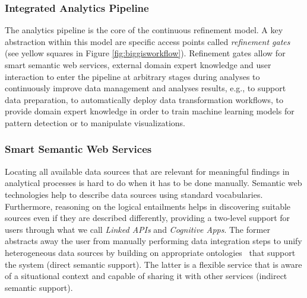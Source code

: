 \documentclass{sig-alternate-05-2015}
\begin{document}
\subsubsection{Integrated Analytics Pipeline}
The analytics pipeline is the core of the continuous refinement model. A key
abstraction within this model are specific access points called
\textit{refinement gates} (see yellow squares in Figure
\ref{fig:biggisworkflow}). Refinement gates allow for smart semantic web
services, external domain expert knowledge and user interaction to enter the
pipeline at arbitrary stages during analyses to continuously improve
data management and analyses results, e.g., to support data preparation, to
automatically deploy data transformation workflows, to provide domain expert
knowledge in order to train machine learning models for pattern detection or to
manipulate visualizations. 

\subsubsection{Smart Semantic Web Services}
Locating all available data sources that are relevant for meaningful findings
in analytical processes is hard to do when it has to be done manually. Semantic
web technologies help to describe data sources using standard vocabularies.
Furthermore, reasoning on the logical entailments helps in discovering suitable
sources even if they are described differently, providing a two-level support
for users through what we call \textit{Linked APIs} and \textit{Cognitive
Apps}. The former abstracts away the user from manually performing data
integration steps to unify heterogeneous data sources by building on
appropriate ontologies~\cite{Frank.2016b} that support the system (direct
semantic support). The latter is a flexible service that is aware of a
situational context and capable of sharing it with other services (indirect
semantic support).
\end{document}
